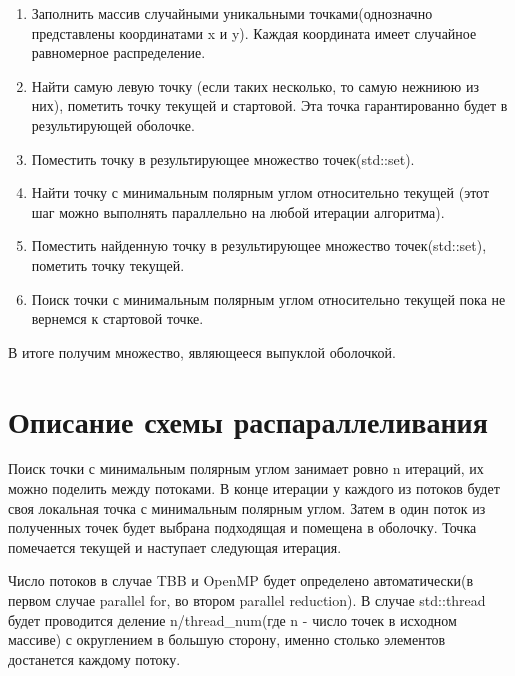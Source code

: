 \documentclass[14pt, a4paper]{extarticle}
\begin{document}
  \begin{enumerate}
    \item Заполнить массив случайными уникальными точками(однозначно представлены координатами x и y). Каждая координата имеет случайное равномерное распределение.
      
     \item Найти самую левую точку (если таких несколько, то самую нежниюю из них), пометить точку текущей и стартовой. Эта точка гарантированно будет в результирующей оболочке.

     \item Поместить точку в результирующее множество точек(std::set).
     
     \item Найти точку с минимальным полярным углом относительно текущей (этот шаг можно выполнять параллельно на любой итерации алгоритма).

     \item Поместить найденную точку в результирующее множество точек(std::set), пометить точку текущей.

     \item Поиск точки с минимальным полярным углом относительно текущей пока не вернемся к стартовой точке.
  \end{enumerate}

  В итоге получим множество, являющееся выпуклой оболочкой.
  \newpage

  \section{Описание схемы распараллеливания}
Поиск точки с минимальным полярным углом занимает ровно n итераций, их можно поделить между потоками. В конце итерации у каждого из потоков будет своя локальная точка с минимальным полярным углом. Затем в один поток из полученных точек будет выбрана подходящая и помещена в оболочку. Точка помечается текущей и наступает следующая итерация.

Число потоков в случае TBB и OpenMP будет определено автоматически(в первом случае parallel for, во втором parallel reduction). В случае std::thread будет проводится деление n/thread\_num(где n - число точек в исходном массиве) с округлением в большую сторону, именно столько элементов достанется каждому потоку.

  \newpage
\end{document}
